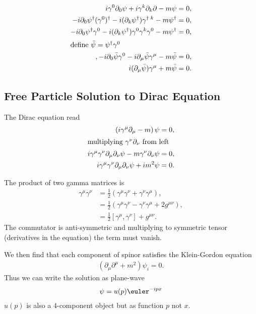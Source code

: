 \begin{align}
   i \gamma^0 \partial_0 \psi + i \gamma^k \partial_k \partial - m \psi = 0, \notag\\
   -i \partial_0 \psi^\dagger (\gamma^0)^\dagger - i(\partial_k \psi^\dagger) \gamma^{\dagger\; k} - m \psi^\dagger = 0, \notag \\
   -i \partial_0 \psi^\dagger \gamma^0 - i(\partial_k \psi^\dagger) \gamma^0 \gamma^k \gamma^0 - m \psi^\dagger = 0, \notag \\
   \shortintertext{define $\bar{\psi} = \psi^\dagger \gamma^0$},
   -i \partial_0 \bar{\psi} \gamma^0 - i \partial_\mu \bar{\psi} \gamma^\mu - m \bar{\psi} = 0, \notag \\
   i(\partial_\mu \bar{\psi}) \gamma^\mu + m \bar{\psi} = 0.
\end{align}

\subsection{Free Particle Solution to Dirac Equation}
The Dirac equation read
\begin{align*}
   \left( i \gamma^\mu \partial_\mu - m \right) \psi &= 0, \\
   \shortintertext{multiplying $\gamma^\nu \partial_\nu$ from left}
   i\gamma^\mu \gamma^\nu \partial_\mu \partial_\nu \psi - m \gamma^\nu \partial_\nu \psi &= 0, \\
   i \gamma^\mu \gamma^\nu \partial_\mu \partial_\nu \psi + i m^2 \psi &= 0. \\
\end{align*}

The product of two gamma matrices is
\begin{align*}
   \gamma^\mu \gamma^\nu  &= \frac{1}{2} \left( \gamma^\mu \gamma^\nu + \gamma^\nu \gamma^\mu  \right), \\
                          &= \frac{1}{2} \left( \gamma^\mu \gamma^\nu - \gamma^\nu \gamma^\mu + 2g^{\mu\nu} \right), \\
                          &= \frac{1}{2} \left[ \gamma^\mu , \gamma^\nu \right] + g^{\mu\nu}.
\end{align*}
The commutator is anti-symmetric and multiplying to symmetric tensor (derivatives in the equation) the term must vanish.

We then find that each component of spinor satisfies the Klein-Gordon equation
\begin{align}
   (\partial_\mu \partial^\mu + m^2) \psi_i = 0.
\end{align}
Thus we can write the solution as plane-wave
\begin{align}
   \psi = u({p}) \euler^{-ipx}
\end{align}
$u({p})$ is also a 4-component object but as function ${p}$ not ${x}$.

